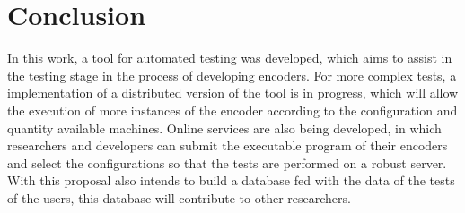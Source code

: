 \documentclass[journal]{IEEEtran}
\begin{document}
\section{Conclusion}

In this work, a tool for automated testing was developed, which aims to assist in the testing stage in the process of developing encoders. For more complex tests, a implementation of a distributed version of the tool is in progress, which will allow the execution of more instances of the encoder according to the configuration and quantity available machines. Online services are also being developed, in which researchers and developers can submit the executable program of their encoders and select the configurations so that the tests are performed on a robust server. With this proposal also intends to build a database fed with the data of the tests of the users, this database will contribute to other researchers.




\end{document}
